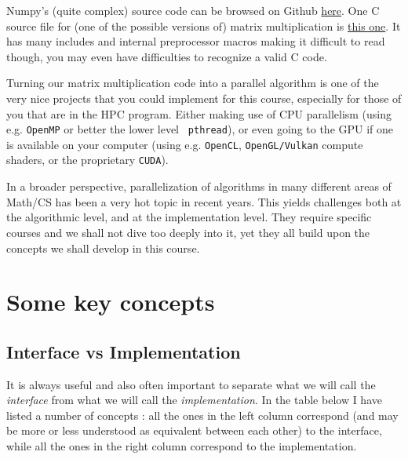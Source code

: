 \documentclass[12pt]{article}
\theoremstyle{plain}
\theoremstyle{remark}
\begin{document}
Numpy's (quite complex) source code can be browsed on Github 
\href{https://github.com/numpy/numpy/tree/main}{here}. One C source
file for (one of the possible versions of) matrix multiplication is
\href{https://github.com/numpy/numpy/blob/main/numpy/_core/src/umath/matmul.c.src}{this
one}. It has many includes and internal preprocessor macros making it difficult 
to read though, you may even have difficulties to recognize a valid C code.   

\medskip

Turning our matrix multiplication code into a parallel algorithm is one of the
very nice projects that you could implement for this course, especially for
those of you that are in the HPC program. Either making use of
CPU parallelism (using e.g. {\tt OpenMP} or better the lower level {\tt
pthread}), or even going to the GPU if one is 
available on your computer (using e.g. {\tt OpenCL}, {\tt OpenGL/Vulkan} 
compute shaders, or the proprietary {\tt CUDA}).

\medskip

In a broader perspective, parallelization of algorithms in many different areas
of Math/CS has been a very hot topic in recent years. This yields challenges both at the
algorithmic level, and at the implementation level. They require specific courses 
and we shall not dive too deeply into it, yet they all build upon the concepts
we shall develop in this course.


\pagebreak
\section{Some key concepts}

\subsection{Interface vs Implementation}

It is always useful and also often important to separate what we will call the 
{\it interface} from what we will call the {\it implementation}. In the table
below I have listed a number of concepts : all the ones in the left column
correspond (and may be more or less understood as equivalent between each
other) to the interface, while all the ones in the right column correspond to
the implementation.
\end{document}
